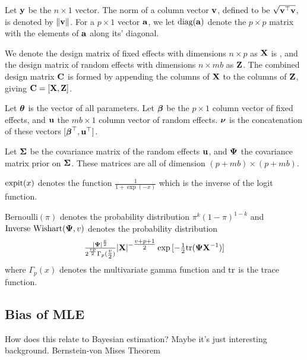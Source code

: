 \documentclass{amsart}[12pt]
\begin{document}
Let ${\bf y}$ be the $n \times 1$ vector. The norm of a column vector ${\bf v}$, defined to be $\sqrt{{\bf v}^\top {\bf v}}$,
is  denoted by $\|{\bf v}\|$. For a $p \times 1$ vector ${\bf a}$, we let $\text{diag}{({\bf a})}$ denote the $p \times p$
matrix with the elements of ${\bf a}$ along its' diagonal.

We denote the design matrix of fixed effects with dimensions $n \times p$ as ${\bf X}$ is , and the design matrix
of random  effects with dimensions $n \times m b$ as ${\bf Z}$. The combined design matrix ${\bf C}$ is formed by
appending the columns of ${\bf X}$ to the columns of ${\bf Z}$, giving ${\bf C} = [ {\bf X}, {\bf Z} ]$.

Let ${\boldsymbol \theta}$ is the vector of all parameters.
Let ${\boldsymbol \beta}$ be the $p \times 1$ column vector of fixed
effects, and ${\bf u}$ the $m b \times 1$ column vector of random effects. ${\boldsymbol \nu}$ is the
concatenation of these vectors $[{\boldsymbol \beta}^\top, {\bf u}^\top]$.

Let ${\boldsymbol \Sigma}$ be the covariance matrix of the random effects ${\bf u}$,
and 
${\boldsymbol \Psi}$ the covariance matrix prior on ${\boldsymbol \Sigma}$.
These matrices are all of dimension $(p + m b) \times (p + m b)$.


$\text{expit} (x)$ denotes the function $\tfrac{1}{1 + \exp(-x)}$ which is the inverse of the logit
function.

$\text{Bernoulli}(\pi)$ denotes the probability distribution $\pi^k (1 - \pi)^{1-k}$ and
$\text{Inverse Wishart}({\boldsymbol \Psi}, v)$ denotes the probability distribution
$$\tfrac{|{\boldsymbol \Psi}|^\frac{v}{2}}{2^{\frac{vp}{2}} \Gamma_p{(\tfrac{v}{2})}} |{\bf X}|^{-\tfrac{v + p + 1}{2}}
\exp{[- \tfrac{1}{2} \text{tr}{({\boldsymbol\Psi}{\bf X}^{-1})}]}$$ where $\Gamma_p{(x)}$ denotes the multivariate gamma function and $\text{tr}$
is the trace function.

\subsection{Bias of MLE}

How does this relate to Bayesian estimation? Maybe it's just interesting background.
Bernstein-von Mises Theorem


% 

\end{document}
